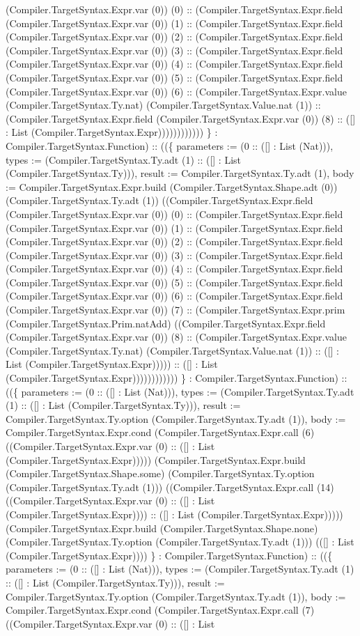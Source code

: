 \documentclass[11pt]{article}
\begin{document}
(Compiler.TargetSyntax.Expr.var (0)) (0) :: (Compiler.TargetSyntax.Expr.field (Compiler.TargetSyntax.Expr.var (0)) (1) :: (Compiler.TargetSyntax.Expr.field (Compiler.TargetSyntax.Expr.var (0)) (2) :: (Compiler.TargetSyntax.Expr.field (Compiler.TargetSyntax.Expr.var (0)) (3) :: (Compiler.TargetSyntax.Expr.field (Compiler.TargetSyntax.Expr.var (0)) (4) :: (Compiler.TargetSyntax.Expr.field (Compiler.TargetSyntax.Expr.var (0)) (5) :: (Compiler.TargetSyntax.Expr.field (Compiler.TargetSyntax.Expr.var (0)) (6) :: (Compiler.TargetSyntax.Expr.value (Compiler.TargetSyntax.Ty.nat) (Compiler.TargetSyntax.Value.nat (1)) :: (Compiler.TargetSyntax.Expr.field (Compiler.TargetSyntax.Expr.var (0)) (8) :: ([] : List (Compiler.TargetSyntax.Expr)))))))))))) \} : Compiler.TargetSyntax.Function) :: ((\{ parameters := (0 :: ([] : List (Nat))), types := (Compiler.TargetSyntax.Ty.adt (1) :: ([] : List (Compiler.TargetSyntax.Ty))), result := Compiler.TargetSyntax.Ty.adt (1), body := Compiler.TargetSyntax.Expr.build (Compiler.TargetSyntax.Shape.adt (0)) (Compiler.TargetSyntax.Ty.adt (1)) ((Compiler.TargetSyntax.Expr.field (Compiler.TargetSyntax.Expr.var (0)) (0) :: (Compiler.TargetSyntax.Expr.field (Compiler.TargetSyntax.Expr.var (0)) (1) :: (Compiler.TargetSyntax.Expr.field (Compiler.TargetSyntax.Expr.var (0)) (2) :: (Compiler.TargetSyntax.Expr.field (Compiler.TargetSyntax.Expr.var (0)) (3) :: (Compiler.TargetSyntax.Expr.field (Compiler.TargetSyntax.Expr.var (0)) (4) :: (Compiler.TargetSyntax.Expr.field (Compiler.TargetSyntax.Expr.var (0)) (5) :: (Compiler.TargetSyntax.Expr.field (Compiler.TargetSyntax.Expr.var (0)) (6) :: (Compiler.TargetSyntax.Expr.field (Compiler.TargetSyntax.Expr.var (0)) (7) :: (Compiler.TargetSyntax.Expr.prim (Compiler.TargetSyntax.Prim.natAdd) ((Compiler.TargetSyntax.Expr.field (Compiler.TargetSyntax.Expr.var (0)) (8) :: (Compiler.TargetSyntax.Expr.value (Compiler.TargetSyntax.Ty.nat) (Compiler.TargetSyntax.Value.nat (1)) :: ([] : List (Compiler.TargetSyntax.Expr))))) :: ([] : List (Compiler.TargetSyntax.Expr)))))))))))) \} : Compiler.TargetSyntax.Function) :: ((\{ parameters := (0 :: ([] : List (Nat))), types := (Compiler.TargetSyntax.Ty.adt (1) :: ([] : List (Compiler.TargetSyntax.Ty))), result := Compiler.TargetSyntax.Ty.option (Compiler.TargetSyntax.Ty.adt (1)), body := Compiler.TargetSyntax.Expr.cond (Compiler.TargetSyntax.Expr.call (6) ((Compiler.TargetSyntax.Expr.var (0) :: ([] : List (Compiler.TargetSyntax.Expr))))) (Compiler.TargetSyntax.Expr.build (Compiler.TargetSyntax.Shape.some) (Compiler.TargetSyntax.Ty.option (Compiler.TargetSyntax.Ty.adt (1))) ((Compiler.TargetSyntax.Expr.call (14) ((Compiler.TargetSyntax.Expr.var (0) :: ([] : List (Compiler.TargetSyntax.Expr)))) :: ([] : List (Compiler.TargetSyntax.Expr))))) (Compiler.TargetSyntax.Expr.build (Compiler.TargetSyntax.Shape.none) (Compiler.TargetSyntax.Ty.option (Compiler.TargetSyntax.Ty.adt (1))) (([] : List (Compiler.TargetSyntax.Expr)))) \} : Compiler.TargetSyntax.Function) :: ((\{ parameters := (0 :: ([] : List (Nat))), types := (Compiler.TargetSyntax.Ty.adt (1) :: ([] : List (Compiler.TargetSyntax.Ty))), result := Compiler.TargetSyntax.Ty.option (Compiler.TargetSyntax.Ty.adt (1)), body := Compiler.TargetSyntax.Expr.cond (Compiler.TargetSyntax.Expr.call (7) ((Compiler.TargetSyntax.Expr.var (0) :: ([] : List 
\end{document}
